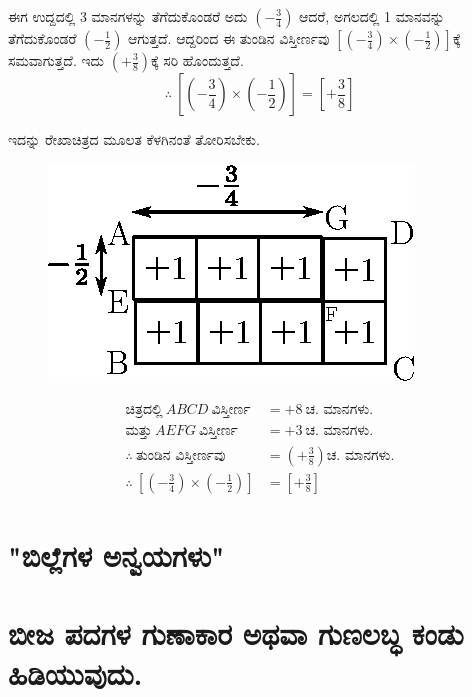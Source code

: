 ಈಗ ಉದ್ದದಲ್ಲಿ 3 ಮಾನಗಳನ್ನು ತೆಗೆದುಕೊಂಡರೆ ಅದು $\left(-\frac{3}{4}\right)$ ಆದರೆ, ಅಗಲದಲ್ಲಿ 1 ಮಾನವನ್ನು ತೆಗೆದುಕೊಂಡರೆ $\left(-\frac{1}{2} \right)$ ಆಗುತ್ತದೆ. ಆದ್ದರಿಂದ ಈ ತುಂಡಿನ ವಿಸ್ತೀರ್ಣವು $\left[\left(-\frac{3}{4}\right) \times \left(-\frac{1}{2}\right) \right]$ಕ್ಕೆ ಸಮವಾಗುತ್ತದೆ. ಇದು $\left(+\frac{3}{8}\right)$ಕ್ಕೆ ಸರಿ ಹೊಂದುತ್ತದೆ. 
$$
\therefore~ \left[\left(-\frac{3}{4}\right) \times \left(-\frac{1}{2}\right) \right] = \left[+ \frac{3}{8} \right]
$$

ಇದನ್ನು ರೇಖಾಚಿತ್ರದ ಮೂಲತ ಕೆಳಗಿನಂತೆ ತೋರಿಸಬೇಕು. 
\begin{figure}[H]
\centering
\includegraphics[scale=0.8]{src/figure/chap3/fig3-28b.eps}
\end{figure}
\begin{align*}
\text{ಚಿತ್ರದಲ್ಲಿ}~ ABCD ~\text{ವಿಸ್ತೀರ್ಣ} & = +8~ \text{ಚ. ಮಾನಗಳು.}\\
\text{ಮತ್ತು}~ AEFG ~\text{ವಿಸ್ತೀರ್ಣ} & = +3~ \text{ಚ. ಮಾನಗಳು.}\\
\therefore~ \text{ತುಂಡಿನ ವಿಸ್ತೀರ್ಣವು} & = \left(+\frac{3}{8} \right) \text{ಚ. ಮಾನಗಳು.}\\
\therefore~ \left[\left(-\frac{3}{4}\right) \times \left(-\frac{1}{2}\right) \right] & = \left[+\frac{3}{8}\right]
\end{align*}

\section{"ಬಿಲ್ಲೆಗಳ ಅನ್ವಯಗಳು"}\label{sec3.4}%

\section*{ಬೀಜ ಪದಗಳ ಗುಣಾಕಾರ ಅಥವಾ ಗುಣಲಬ್ಧ ಕಂಡು ಹಿಡಿಯುವುದು.}

